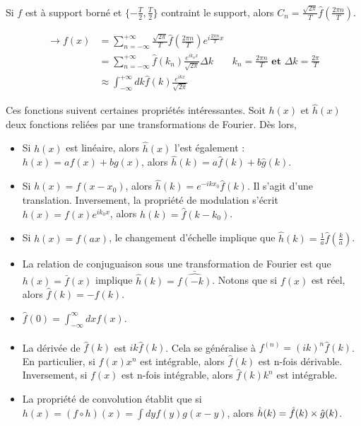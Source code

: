 \documentclass[../notesdecours.tex]{subfiles}
\begin{document}
\begin{remark}
Si $f$ est à support borné et $\{-\frac{T}{2},\frac{T}{2}\}$ contraint le support, alors $C_n = \frac{\sqrt{2\pi}}{T}\hat{f}(\frac{2\pi n}{T})$.
\end{remark}
\begin{align}
\rightarrow f(x) &= \sum_{n = -\infty}^{+\infty} \frac{\sqrt{2\pi}}{T}\hat{f}(\frac{2\pi n}{T})e^{i\frac{2\pi n}{T}x}\\
&= \sum_{n = -\infty}^{+\infty} \hat{f}(k_n)\frac{e^{ik_nx}}{\sqrt{2\pi}} \Delta k		&k_n = \frac{2\pi n}{T} \textbf{ et } \Delta k = \frac{2\pi}{T}\\
&\approx \int_{-\infty}^{+\infty} dk \hat{f}(k) \frac{e^{ikx}}{\sqrt{2\pi}}
\end{align}
\begin{remark}
Ces fonctions suivent certaines propriétés intéressantes. Soit $h(x)$ et $\hat{h}(x)$ deux fonctions reliées par une transformations de Fourier. Dès lors,
\begin{itemize}
\item Si $h(x)$ est linéaire, alors $\hat{h}(x)$ l'est également : $h(x) = af(x) + bg(x)$, alors $\hat{h}(k) = a\hat{f}(k) + b\hat{g}(k)$.
\item Si $h(x) = f(x-x_0)$, alors $\hat{h}(k) = e^{-ikx_0}\hat{f}(k)$. Il s'agit d'une translation. Inversement, la propriété de modulation s'écrit $h(x) = f(x)e^{ik_0x}$, alors $\hat{h}(k) = \hat{f}(k-k_0)$.
\item Si $h(x) = f(ax)$, le changement d'échelle implique que $\hat{h}(k) = \frac{1}{a}\hat{f}(\frac{k}{a})$.
\item La relation de conjuguaison sous une transformation de Fourier est que $h(x) = \bar{f}(x)$ implique $\hat{h}(k) = \bar{\hat{f(-k)}}$. Notons que si $f(x)$ est réel, alors $\hat{f}(k) = -\hat{f}(k)$.
\item $\hat{f}(0) = \int_{-\infty}^{\infty} dxf(x)$.
\item La dérivée de $\hat{f}(k)$ est $ik\hat{f}(k)$. Cela se généralise à $\hat{f^(n)} = (ik)^n\hat{f}(k)$. En particulier, si $f(x)x^n$ est intégrable, alors $\hat{f}(k)$ est n-fois dérivable. Inversement, si $f(x)$ est n-fois intégrable, alors $\hat{f}(k)k^n$ est intégrable.
\item La propriété de convolution établit que si $h(x) = (f\circ h)(x) = \int dy f(y)g(x-y)$, alors $\hat{h}(k) = \hat{f}(k)\times\hat{g}(k)$.
\end{itemize}

\end{remark}
\end{document}
